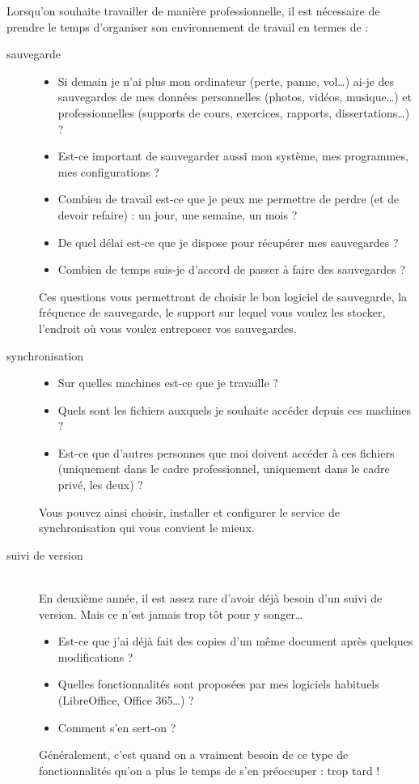 \documentclass[10pt,a4paper]{report}
\begin{document}
Lorsqu'on souhaite travailler de manière professionnelle, il est nécessaire de prendre le temps d'organiser son environnement de travail en termes de :
\begin{description}
	\item[sauvegarde]
		\leavevmode
		\vspace{-1ex}
		\begin{itemize}
			\item Si demain je n'ai plus mon ordinateur (perte, panne, vol\dots) ai-je des sauvegardes de mes données personnelles (photos, vidéos, musique\dots) et professionnelles (supports de cours, exercices, rapports, dissertations\dots) ?
			\item Est-ce important de sauvegarder aussi mon système, mes programmes, mes configurations ?
			\item Combien de travail est-ce que je peux me permettre de perdre (et de devoir refaire) : un jour, une semaine, un mois ?
			\item De quel délai est-ce que je dispose pour récupérer mes sauvegardes ?
			\item Combien de temps suis-je d'accord de passer à faire des sauvegardes ?
		\end{itemize}
		Ces questions vous permettront de choisir le bon logiciel de sauvegarde, la fréquence de sauvegarde, le support sur lequel vous voulez les stocker, l'endroit où vous voulez entreposer vos sauvegardes.
	\item[synchronisation]
	\leavevmode
	\vspace{-1ex}
		\begin{itemize}
			\item Sur quelles machines est-ce que je travaille ?
			\item Quels sont les fichiers auxquels je souhaite accéder depuis ces machines ?
			\item Est-ce que d'autres personnes que moi doivent accéder à ces fichiers (uniquement dans le cadre professionnel, uniquement dans le cadre privé, les deux) ?
		\end{itemize}
		Vous pouvez ainsi choisir, installer et configurer le service de synchronisation qui vous convient le mieux.
	\item[suivi de version] ~\\[1ex]
		En deuxième année, il est assez rare d'avoir déjà besoin d'un suivi de version. Mais ce n'est jamais trop tôt pour y songer\dots
		\begin{itemize}
			\item Est-ce que j'ai déjà fait des copies d'un même document après quelques modifications ?
			\item Quelles fonctionnalités sont proposées par mes logiciels habituels (LibreOffice, Office 365\dots) ?
			\item Comment s'en sert-on ?
		\end{itemize}
		Généralement, c'est quand on a vraiment besoin de ce type de fonctionnalités qu'on a plus le temps de s'en préoccuper : trop tard !
\end{description}
\end{document}
